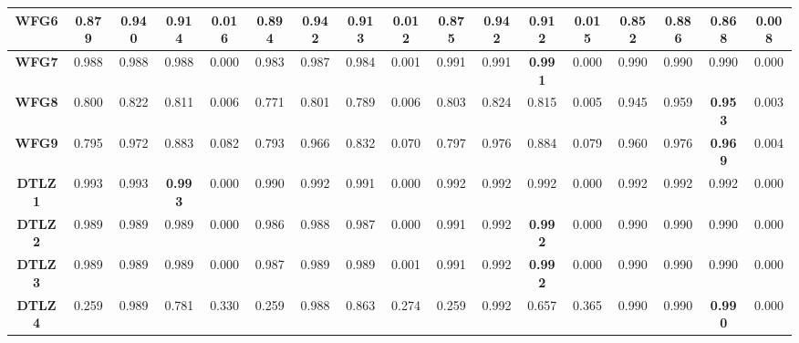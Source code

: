 \begin{table*}
\begin{tabular}{|c|c|c|c|c|c|c|c|c|c|c|c|c|c|c|c|c|}
\hline
\textbf{WFG6}         & 0.879           & 0.940           & \textbf{0.914 } & 0.016           & 0.894           & 0.942           & 0.913           & 0.012           & 0.875           & 0.942           & 0.912           & 0.015           & 0.852           & 0.886           & 0.868           & 0.008            \\ 
\hline
\textbf{WFG7}         & 0.988           & 0.988           & 0.988           & 0.000           & 0.983           & 0.987           & 0.984           & 0.001           & 0.991           & 0.991           & \textbf{0.991 } & 0.000           & 0.990           & 0.990           & 0.990           & 0.000            \\ 
\hline
\textbf{WFG8}         & 0.800           & 0.822           & 0.811           & 0.006           & 0.771           & 0.801           & 0.789           & 0.006           & 0.803           & 0.824           & 0.815           & 0.005           & 0.945           & 0.959           & \textbf{0.953 } & 0.003            \\ 
\hline
\textbf{WFG9}         & 0.795           & 0.972           & 0.883           & 0.082           & 0.793           & 0.966           & 0.832           & 0.070           & 0.797           & 0.976           & 0.884           & 0.079           & 0.960           & 0.976           & \textbf{0.969 } & 0.004            \\ 
\hline
\textbf{DTLZ1}        & 0.993           & 0.993           & \textbf{0.993 } & 0.000           & 0.990           & 0.992           & 0.991           & 0.000           & 0.992           & 0.992           & 0.992           & 0.000           & 0.992           & 0.992           & 0.992           & 0.000            \\ 
\hline
\textbf{DTLZ2}        & 0.989           & 0.989           & 0.989           & 0.000           & 0.986           & 0.988           & 0.987           & 0.000           & 0.991           & 0.992           & \textbf{0.992 } & 0.000           & 0.990           & 0.990           & 0.990           & 0.000            \\ 
\hline
\textbf{DTLZ3}        & 0.989           & 0.989           & 0.989           & 0.000           & 0.987           & 0.989           & 0.989           & 0.001           & 0.991           & 0.992           & \textbf{0.992 } & 0.000           & 0.990           & 0.990           & 0.990           & 0.000            \\ 
\hline
\textbf{DTLZ4}        & 0.259           & 0.989           & 0.781           & 0.330           & 0.259           & 0.988           & 0.863           & 0.274           & 0.259           & 0.992           & 0.657           & 0.365           & 0.990           & 0.990           & \textbf{0.990 } & 0.000            \\ 

\end{tabular}
\end{table*}
